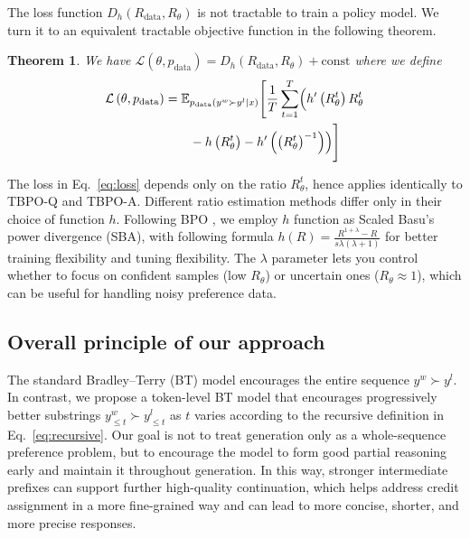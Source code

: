 \documentclass{article}
\theoremstyle{plain}
\newtheorem{theorem}{Theorem}[section]
\theoremstyle{definition}
\theoremstyle{remark}
\begin{document}
The loss function $D_{h}\left(R_{\text{data}},R_{\theta}\right)$ is not tractable to train a policy model. We turn it to an equivalent tractable objective function in the following theorem. 


\begin{theorem}
\label{theorem:loss}
    We have $\mathcal{L}\left(\theta,p_{\text{data}}\right)=D_{h}\left(R_{\text{data}},R_{\theta}\right)+\text{const}$ where we define
    {\footnotesize
\begin{equation}
\begin{split}
\mathcal{L}\left(\theta,p_{\text{data}}\right)
&=
\mathbb{E}_{p_{\text{data}}\left(y^{w}\succ y^{l}\mid x\right)}
\Biggl[
\frac{1}{T}\sum_{t=1}^{T}
\Bigl(
h'\left(R_{\theta}^{t}\right)R_{\theta}^{t}
\\
&\qquad
- h\left(R_{\theta}^{t}\right)
- h'\left(\left(R_{\theta}^{t}\right)^{-1}\right)
\Bigr)
\Biggr]
\end{split}
\label{eq:loss}
\end{equation}}

\end{theorem}
The loss in Eq.~\eqref{eq:loss} depends only on the ratio $R_{\theta}^t$, hence applies identically to TBPO-Q and TBPO-A.
Different ratio estimation methods differ only in their choice of function $h$. Following BPO \cite{kim2025preferenceoptimizationestimatingratio}, we employ $h$ function as Scaled Basu’s power divergence (SBA), with following formula $h(R) = \frac{R^{1+\lambda} - R}{s\lambda(\lambda+1)}$ for better training flexibility and tuning flexibility. The $\lambda$ parameter lets you control whether to focus on confident samples (low $R_{\theta}$) or uncertain ones ($R_{\theta} \approx 1$), which can be useful for handling noisy preference data.





\subsection{Overall principle of our approach}
The standard Bradley--Terry (BT) model encourages the entire sequence $y^w \succ y^l$.
In contrast, we propose a token-level BT model that encourages progressively better substrings $y^w_{\le t} \succ y^l_{\le t}$ as $t$ varies according to the recursive definition in Eq.~\eqref{eq:recursive}.
Our goal is not to treat generation only as a whole-sequence preference problem, but to encourage the model to form good partial reasoning early and maintain it throughout generation.
In this way, stronger intermediate prefixes can support further high-quality continuation, which helps address credit assignment in a more fine-grained way and can lead to more concise, shorter, and more precise responses.
\end{document}
